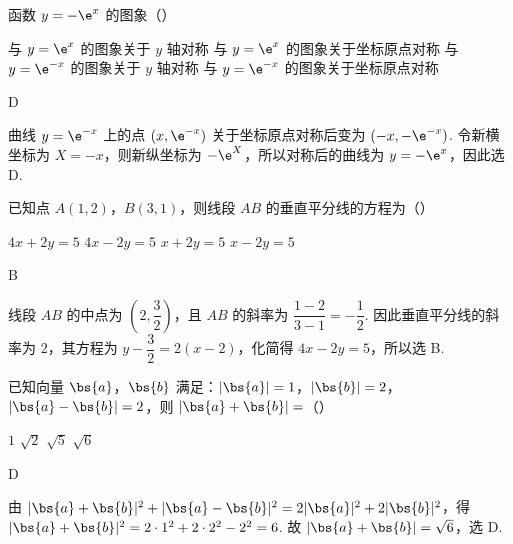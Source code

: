 \begin{problem}
函数 \(y=-\e^x\) 的图象（\quad）

\choices
    {与 \(y=\e^x\) 的图象关于 \(y\) 轴对称}
    {与 \(y=\e^x\) 的图象关于坐标原点对称}
    {与 \(y=\e^{-x}\) 的图象关于 \(y\) 轴对称}
    {与 \(y=\e^{-x}\) 的图象关于坐标原点对称}
\end{problem}

\begin{answer}
D
\end{answer}

\begin{solution}
曲线 \(y=\e^{-x}\) 上的点 \((x,\e^{-x})\) 关于坐标原点对称后变为 \((-x,-\e^{-x})\). 令新横坐标为 \(X=-x\)，则新纵坐标为 \(-\e^X\)，所以对称后的曲线为 \(y=-\e^x\)，因此选 D.
\end{solution}

\begin{problem}
已知点 \(A(1,2)\)，\(B(3,1)\)，则线段 \(AB\) 的垂直平分线的方程为（\quad）

\choices
    {\(4x+2y=5\)}
    {\(4x-2y=5\)}
    {\(x+2y=5\)}
    {\(x-2y=5\)}
\end{problem}

\begin{answer}
B
\end{answer}

\begin{solution}
线段 \(AB\) 的中点为 \(\left(2,\dfrac{3}{2}\right)\)，且 \(AB\) 的斜率为 \(\dfrac{1-2}{3-1}=-\dfrac{1}{2}\). 因此垂直平分线的斜率为 \(2\)，其方程为 \(y-\dfrac{3}{2}=2(x-2)\)，化简得 \(4x-2y=5\)，所以选 B.
\end{solution}

\begin{problem}
已知向量 \(\bs{a}\)，\(\bs{b}\) 满足：\(\left|\bs{a}\right|=1\)，\(\left|\bs{b}\right|=2\)，\(\left|\bs{a}-\bs{b}\right|=2\)，则 \(\left|\bs{a}+\bs{b}\right|=\)（\quad）

\choices
    {\(1\)}
    {\(\sqrt2\)}
    {\(\sqrt5\)}
    {\(\sqrt6\)}
\end{problem}

\begin{answer}
D
\end{answer}

\begin{solution}
由 \(\lvert\bs{a}+\bs{b}\rvert^2+\lvert\bs{a}-\bs{b}\rvert^2=2\lvert\bs{a}\rvert^2+2\lvert\bs{b}\rvert^2\)，得 \(\lvert\bs{a}+\bs{b}\rvert^2=2\cdot1^2+2\cdot2^2-2^2=6\). 故 \(\lvert\bs{a}+\bs{b}\rvert=\sqrt6\)，选 D.
\end{solution}

